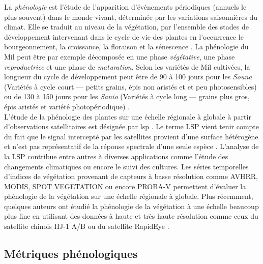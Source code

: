 La \emph{phénologie} 
est l’étude de l’apparition d’événements périodiques (annuels le plus souvent) dans le monde vivant, déterminée par les variations saisonnières du climat. Elle se traduit au niveau de 
la végétation, par l’ensemble des stades de développement intervenant dans le cycle de vie des plantes en l’occurrence le bourgeonnement, la croissance, la floraison et la 
sénescence \citep{Kimball2014}. La phénologie du Mil peut être par exemple décomposée en une phase \emph{végétative}, une phase \emph{reproductrice} et une phase de 
\emph{maturation}. Selon les variétés de Mil cultivées, la longueur du cycle de développement peut être de 90 à 100 jours pour les \emph{Souna} (Variétés à cycle court --- 
petits grains, épis non aristés et et peu photosensibles) ou de 130 à 150 jours pour les \emph{Sanio} (Variétés à cycle long --- grains plus gros, épis aristés et variété photopériodique) \citep{Diouf2001}.
\\L'\'etude de la phénologie des plantes sur une échelle régionale à globale à partir d’observations satellitaires est désignée par \acrfull{lsp} \citep{Helman2018}. Le terme LSP 
vient tenir compte du fait que le signal intercepté par les satellites provient d’une surface hétérogène et n’est pas représentatif de la réponse spectrale d’une seule espèce 
\citep{Kimball2014}. L'analyse de la LSP contribue entre autres à diverses applications comme l’étude des changements climatiques \citep{Begue2014} ou encore le suivi des
cultures. Les séries temporelles d’indices de végétation provenant de capteurs à basse résolution comme AVHRR, MODIS, SPOT VEGETATION ou encore PROBA-V permettent d’évaluer 
la phénologie de la végétation sur une échelle régionale à globale. Plus récemment, quelques auteurs ont étudié la phénologie de la végétation à une échelle beaucoup plus fine en utilisant des données
à haute et très haute résolution comme ceux du satellite chinois HJ-1 A/B \citep{Pan2015} ou du satellite RapidEye \citep{Vrieling2017}.

  \subsection{Métriques phénologiques}

